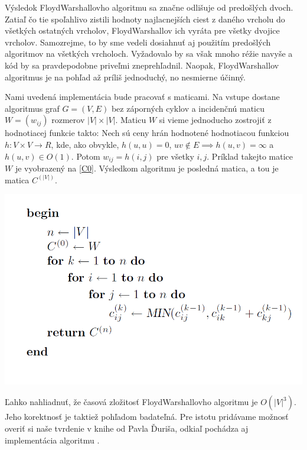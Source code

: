 Výsledok Floyd\textendash Warshallovho algoritmu sa značne odlišuje od predošlých dvoch. Zatiaľ čo tie spoľahlivo zistili hodnoty najlacnejších ciest z daného vrcholu do všetkých ostatných vrcholov, Floyd\textendash Warshallov ich vyráta pre všetky dvojice vrcholov. Samozrejme, to by sme vedeli dosiahnuť aj použitím predošlých algoritmov na všetkých vrcholoch. Vyžadovalo by sa však mnoho réžie navyše a kód by sa pravdepodobne priveľmi zneprehľadnil. Naopak, Floyd\textendash Warshallov algoritmus je na pohľad až príliš jednoduchý, no nesmierne účinný.\newline

Nami uvedená implementácia bude pracovať s maticami. Na vstupe dostane algoritmus graf $G = (V, E)$ bez záporných cyklov a incidenčnú maticu $W = (w_{ij})$ rozmerov $|V|\times |V|$. Maticu $W$ si vieme jednoducho zostrojiť z hodnotiacej funkcie takto: Nech sú ceny hrán hodnotené hodnotiacou funkciou $h: V \times V \rightarrow R$, kde, ako obvykle, $h(u,u) = 0$, $uv \notin E \implies h(u,v) = \infty$ a $h(u,v) \in O(1)$. Potom $w_{ij} = h(i,j)$ pre všetky $i, j$. Príklad takejto matice $W$ je vyobrazený na \ref{C0}. Výsledkom algoritmu je posledná matica, a tou je matica $C^{(|V|)}$.\newline

\begin{algorithm}[H]
  \includegraphics[width=\linewidth]{./images/Alg_Floyd-Warshall.png}
  \caption{Floyd\textendash Washallov algoritmus}
  \label{Alg_Floyd-Warshall}
  \centering
\end{algorithm}

Ľahko nahliadnuť, že časová zložitosť Floyd\textendash Warshallovho algoritmu je $O(|V|^{3})$. Jeho korektnosť je taktiež pohľadom badateľná. Pre istotu pridávame možnosť overiť si naše tvrdenie v knihe od Pavla Ďuriša, odkiaľ pochádza aj implementácia algoritmu \cite[kapitola 2.2.2]{duris2009}.\newline

